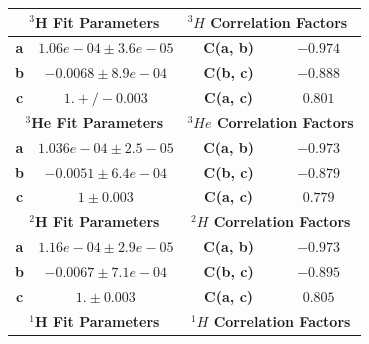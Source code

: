 \documentclass[final,5p,times,twocolumn]{elsarticle}
\begin{document}
\begin{table}[!h]
\begin{tabular}{|c|c|l|c|c|l|}
\hline
\multicolumn{3}{|c|}{\textbf{$^{3}$H Fit Parameters}}                                & \multicolumn{3}{l|}{\textbf{$^{3}H$ Correlation Factors}}    \\ \hline
\textbf{a}              & \multicolumn{2}{c|}{$1.06e-04 \pm 3.6e-05$}                & \textbf{C(a, b)}             & \multicolumn{2}{c|}{$-0.974$} \\ \hline
\textbf{b}              & \multicolumn{2}{c|}{$-0.0068 \pm 8.9e-04$}                 & \textbf{C(b, c)}             & \multicolumn{2}{c|}{$-0.888$} \\ \hline
\textbf{c}              & \multicolumn{2}{c|}{$1. +/- 0.003$}                        & \textbf{C(a, c)}             & \multicolumn{2}{c|}{$0.801$}  \\ \hline
\multicolumn{3}{|c|}{\textbf{$^{3}$He Fit Parameters}}                               & \multicolumn{3}{c|}{\textbf{$^{3}He$ Correlation Factors}}   \\ \hline
\textbf{a}              & \multicolumn{2}{c|}{$1.036e-04\pm 2.5-05$}                 & \textbf{C(a, b)}                      & \multicolumn{2}{c|}{$-0.973$} \\ \hline
\textbf{b}              & \multicolumn{2}{c|}{$-0.0051 \pm 6.4e-04$}                 & \textbf{C(b, c)}                      & \multicolumn{2}{c|}{$-0.879$} \\ \hline
\textbf{c}              & \multicolumn{2}{c|}{$1 \pm 0.003$}                         & \textbf{C(a, c)}                     & \multicolumn{2}{c|}{$0.779$}  \\ \hline
\multicolumn{3}{|c|}{\textbf{$^{2}$H Fit Parameters}}                                & \multicolumn{3}{c|}{\textbf{$^{2}H$ Correlation Factors}}    \\ \hline
\textbf{a}              & \multicolumn{2}{c|}{$1.16e-04 \pm 2.9e-05$} & \textbf{C(a, b)}             & \multicolumn{2}{c|}{$-0.973$} \\ \hline
\textbf{b}              & \multicolumn{2}{c|}{$-0.0067 \pm 7.1e-04$}                 & \textbf{C(b, c)}             & \multicolumn{2}{c|}{$-0.895$} \\ \hline
\textbf{c}              & \multicolumn{2}{c|}{$1. \pm 0.003$}                        & \textbf{C(a, c)}             & \multicolumn{2}{c|}{$0.805$}  \\ \hline
\multicolumn{3}{|c|}{\textbf{$^{1}$H Fit Parameters}}                                & \multicolumn{3}{c|}{\textbf{$^{1}H$ Correlation Factors}}    \\ \hline

\end{tabular}
\end{table}
\end{document}
